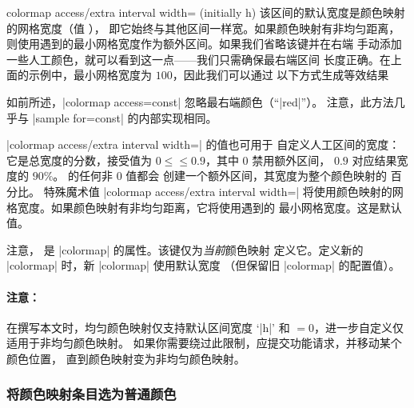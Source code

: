 {\begin{pgfplotskey}{colormap access/extra interval width= (initially h)}
    该区间的默认宽度是颜色映射的网格宽度（值 ），
    即它始终与其他区间一样宽。如果颜色映射有非均匀距离，
    则使用遇到的最小网格宽度作为额外区间。如果我们省略该键并在右端
    手动添加一些人工颜色，就可以看到这一点——我们只需确保最右端区间
    长度正确。在上面的示例中，最小网格宽度为 $100$，因此我们可以通过
    以下方式生成等效结果
\begin{codeexample}[]
\pgfplotscolorbardrawstandalone[
    colormap={nonuniform}{
        of colormap={
            viridis,
            target pos={0,200,300,500,700,1000}
        },
        color(1100)=(red)
    },
    colorbar horizontal,
    colormap access=const,
    colorbar style={xtick=data,font=\tiny,
        /pgf/number format/precision=0},
    colormap access=const,
]
\end{codeexample}
    \noindent 如前所述，|colormap access=const| 忽略最右端颜色（``|red|''）。
    注意，此方法几乎与 |sample for=const| 的内部实现相同。

    |colormap access/extra interval width=| 的值也可用于
    自定义人工区间的宽度：它是总宽度的分数，接受值为
    $0\le$$\le 0.9$，其中 $0$ 禁用额外区间，
    $0.9$ 对应结果宽度的 $90\%$。 的任何非 $0$ 值都会
    创建一个额外区间，其宽度为整个颜色映射的  百分比。
    特殊魔术值 |colormap access/extra interval width=|
    将使用颜色映射的网格宽度。如果颜色映射有非均匀距离，它将使用遇到的
    最小网格宽度。这是默认值。

    注意， 是 |colormap| 的属性。该键仅为\emph{当前}颜色映射
    定义它。定义新的 |colormap| 时，新 |colormap| 使用默认宽度
    （但保留旧 |colormap| 的配置值）。


    \paragraph{注意：}

    在撰写本文时，均匀颜色映射仅支持默认区间宽度 `|h|' 和
    $=0$，进一步自定义仅适用于非均匀颜色映射。
    如果你需要绕过此限制，应提交功能请求，并移动某个颜色位置，
    直到颜色映射变为非均匀颜色映射。
\end{pgfplotskey}

}%


\subsubsection{将颜色映射条目选为普通颜色}

